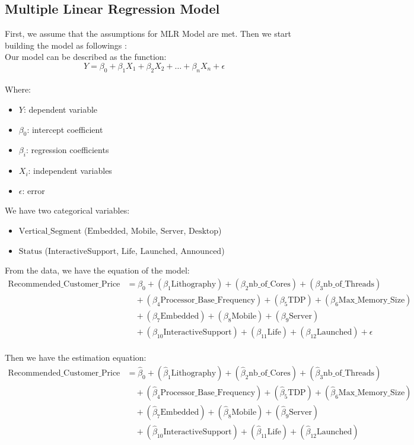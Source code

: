 \documentclass[a4paper]{article}
\begin{document}
	\subsection{Multiple Linear Regression Model}
	First, we assume that the assumptions for MLR Model are met. Then we start building the model as followings :\\
	Our model can be described as the function:
	\[
	Y = \beta_0 + \beta_1 X_1 + \beta_2 X_2 + \ldots + \beta_n X_n + \epsilon
	\]
	\\Where:
	\begin{itemize}
		\item $Y$: dependent variable
		\item $\beta_0$: intercept coefficient
		\item $\beta_i$: regression coefficients
		\item $X_i$: independent variables
		\item $\epsilon$: error
	\end{itemize}
	We have two categorical variables:
	\begin{itemize}
		\item $\text{Vertical\_Segment}$ ($\text{Embedded}$, $\text{Mobile}$, $\text{Server}$, $\text{Desktop}$)
		\item $\text{Status}$ ($\text{InteractiveSupport}$, $\text{Life}$, $\text{Launched}$, $\text{Announced}$)
	\end{itemize}
	From the data, we have the equation of the model:
		\begin{align*}
		\text{Recommended\_Customer\_Price} &= \beta_0 + (\beta_1 \text{Lithography}) + (\beta_2 \text{nb\_of\_Cores}) + (\beta_3 \text{nb\_of\_Threads}) \\
		&\quad + (\beta_4 \text{Processor\_Base\_Frequency}) + (\beta_5 \text{TDP}) + (\beta_6 \text{Max\_Memory\_Size}) \\
		&\quad + (\beta_7 \text{Embedded}) + (\beta_8 \text{Mobile}) + (\beta_9 \text{Server}) \\
		&\quad + (\beta_{10} \text{InteractiveSupport}) + (\beta_{11} \text{Life}) + (\beta_{12} \text{Launched}) +\epsilon
	\end{align*}
	\\Then we have the estimation equation:
	\begin{align*}
		\text{Recommended\_Customer\_Price} &= \hat{\beta}_0 + (\hat{\beta}_1 \text{Lithography}) + (\hat{\beta}_2 \text{nb\_of\_Cores}) + (\hat{\beta}_3 \text{nb\_of\_Threads}) \\
		&\quad + (\hat{\beta}_4 \text{Processor\_Base\_Frequency}) + (\hat{\beta}_5 \text{TDP}) + (\hat{\beta}_6 \text{Max\_Memory\_Size}) \\
		&\quad + (\hat{\beta}_7 \text{Embedded}) + (\hat{\beta}_8 \text{Mobile}) + (\hat{\beta}_9 \text{Server}) \\
		&\quad + (\hat{\beta}_{10} \text{InteractiveSupport}) + (\hat{\beta}_{11} \text{Life}) + (\hat{\beta}_{12} \text{Launched})
	\end{align*}
\end{document}
